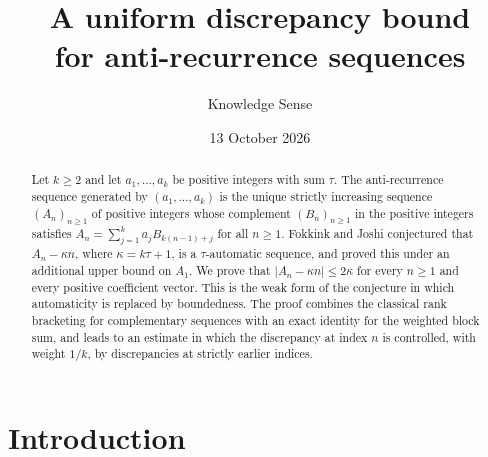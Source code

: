 \documentclass{amsart}
\theoremstyle{definition}
\theoremstyle{remark}
\numberwithin{equation}{section}
\numberwithin{table}{section}
\begin{document}
\title[Discrepancy of anti-recurrence sequences]{A uniform discrepancy bound\\ for anti-recurrence sequences}

\author{Knowledge Sense}
\address{Knowledge Sense}

\date{13 October 2026}



\begin{abstract}
Let $k\ge 2$ and let $a_1,\dots,a_k$ be positive integers with sum $\tau$. The anti-recurrence sequence generated by $(a_1,\dots,a_k)$ is the unique strictly increasing sequence $(A_n)_{n\ge1}$ of positive integers whose complement $(B_n)_{n\ge1}$ in the positive integers satisfies $A_n=\sum_{j=1}^k a_jB_{k(n-1)+j}$ for all $n\ge1$. Fokkink and Joshi conjectured that $A_n-\kappa n$, where $\kappa=k\tau+1$, is a $\tau$-automatic sequence, and proved this under an additional upper bound on $A_1$. We prove that $\lvert A_n-\kappa n\rvert\le 2\kappa$ for every $n\ge1$ and every positive coefficient vector. This is the weak form of the conjecture in which automaticity is replaced by boundedness. The proof combines the classical rank bracketing for complementary sequences with an exact identity for the weighted block sum, and leads to an estimate in which the discrepancy at index $n$ is controlled, with weight $1/k$, by discrepancies at strictly earlier indices.
\end{abstract}

\maketitle

\section{Introduction}
\end{document}
